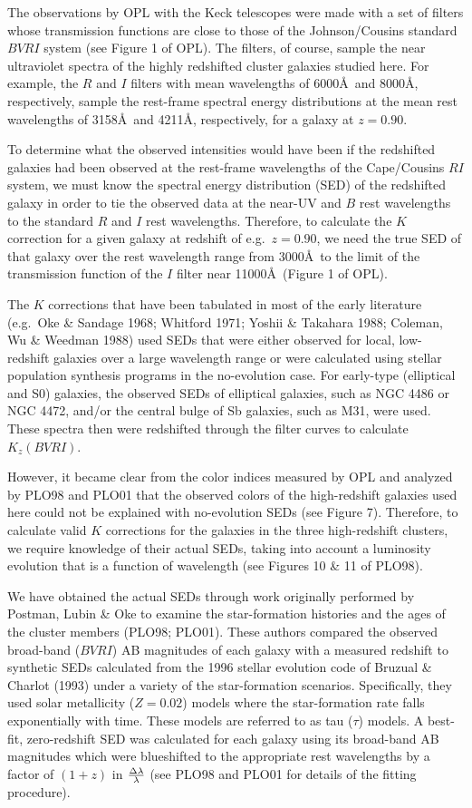 \documentclass[preprint]{aastex}
\begin{document}
The observations by OPL with the Keck telescopes were made with a set
of filters whose transmission functions are close to those of the
Johnson/Cousins standard $BVRI$ system (see Figure 1 of OPL). The
filters, of course, sample the near ultraviolet spectra of the highly
redshifted cluster galaxies studied here.  For example, the $R$ and
$I$ filters with mean wavelengths of 6000\AA\ and 8000\AA,
respectively, sample the rest-frame spectral energy distributions at
the mean rest wavelengths of 3158\AA\ and 4211\AA, respectively, for a
galaxy at $z = 0.90$.

To determine what the observed intensities would have been if the
redshifted galaxies had been observed at the rest-frame wavelengths of
the Cape/Cousins $RI$ system, we must know the spectral energy
distribution (SED) of the redshifted galaxy in order to tie the
observed data at the near-UV and $B$ rest wavelengths to the standard
$R$ and $I$ rest wavelengths. Therefore, to calculate the $K$
correction for a given galaxy at redshift of e.g.\ $z = 0.90$, we need
the true SED of that galaxy over the rest wavelength range from
3000\AA\ to the limit of the transmission function of the $I$ filter
near 11000\AA\ (Figure 1 of OPL).

The $K$ corrections that have been tabulated in most of the early
literature (e.g.\ Oke \& Sandage 1968; Whitford 1971; Yoshii \&
Takahara 1988; Coleman, Wu \& Weedman 1988) used SEDs that were either
observed for local, low-redshift galaxies over a large wavelength
range or were calculated using stellar population synthesis programs
in the no-evolution case. For early-type (elliptical and S0) galaxies,
the observed SEDs of elliptical galaxies, such as NGC 4486 or NGC
4472, and/or the central bulge of Sb galaxies, such as M31, were
used. These spectra then were redshifted through the filter curves to
calculate $K_z(BVRI)$.

However, it became clear from the color indices measured by OPL and
analyzed by PLO98 and PLO01 that the observed colors of the
high-redshift galaxies used here could not be explained with
no-evolution SEDs (see Figure 7). Therefore, to calculate valid $K$
corrections for the galaxies in the three high-redshift clusters, we
require knowledge of their actual SEDs, taking into account a
luminosity evolution that is a function of wavelength (see Figures 10
\& 11 of PLO98).

We have obtained the actual SEDs through work originally performed by
Postman, Lubin \& Oke to examine the star-formation histories and the
ages of the cluster members (PLO98; PLO01). These authors compared the
observed broad-band ($BVRI$) AB magnitudes of each galaxy with a
measured redshift to synthetic SEDs calculated from the 1996 stellar
evolution code of Bruzual \& Charlot (1993) under a variety of the
star-formation scenarios.  Specifically, they used solar metallicity
($Z = 0.02$) models where the star-formation rate falls exponentially
with time. These models are referred to as tau ($\tau$) models. A
best-fit, zero-redshift SED was calculated for each galaxy using its
broad-band AB magnitudes which were blueshifted to the appropriate
rest wavelengths by a factor of $(1 + z)$ in ${\Delta
\lambda}\over{\lambda}$ (see PLO98 and PLO01 for details of the
fitting procedure).
\end{document}
